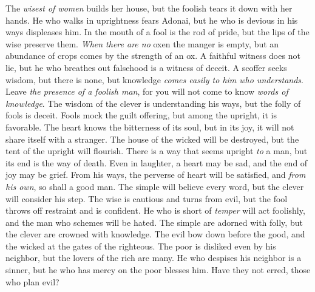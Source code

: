\begin{biblechapter} %
\verse The \textit{wisest of women} builds her house, 
but the foolish tears it down with her hands.
\verse He who walks in uprightness fears Adonai, 
but he who is devious in his ways displeases him.
\verse In the mouth of a fool is the rod of pride, 
but the lips of the wise preserve them.
\verse \textit{When there are no} oxen the manger is empty, 
but an abundance of crops comes by the strength of an ox.
\verse A faithful witness does not lie, 
but he who breathes out falsehood is a witness of deceit.
\verse A scoffer seeks wisdom, but there is none, 
but knowledge \textit{comes easily to him who understands}.
\verse Leave \textit{the presence of a foolish man}, 
for you will not come to know \textit{words of knowledge}.
\verse The wisdom of the clever is understanding his ways, 
but the folly of fools is deceit.
\verse Fools mock the guilt offering, 
but among the upright, it is favorable.
\verse The heart knows the bitterness of its soul, 
but in its joy, it will not share itself with a stranger.
\verse The house of the wicked will be destroyed, 
but the tent of the upright will flourish.
\verse There is a way that seems upright \textit{to} a man, 
but its end is the way of death.
\verse Even in laughter, a heart may be sad, 
and the end of joy may be grief.
\verse From his ways, the perverse of heart will be satisfied, 
and \textit{from his own}, so shall a good man.
\verse The simple will believe every word, 
but the clever will consider his step.
\verse The wise is cautious and turns from evil, 
but the fool throws off restraint and is confident.
\verse He who is short of \textit{temper} will act foolishly, 
and the man who schemes will be hated.
\verse The simple are adorned with folly, 
but the clever are crowned with knowledge.
\verse The evil bow down before the good, 
and the wicked at the gates of the righteous.
\verse The poor is disliked even by his neighbor, 
but the lovers of the rich are many.
\verse He who despises his neighbor is a sinner, 
but he who has mercy on the poor blesses him.
\verse Have they not erred, those who plan evil? 

\end{biblechapter}
